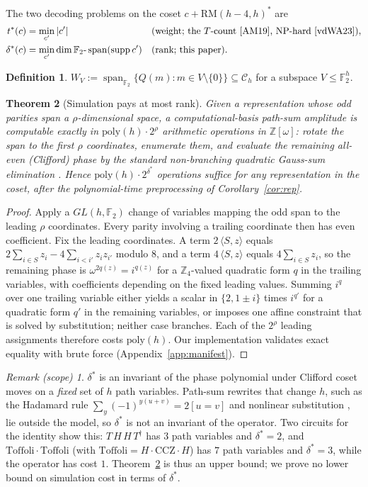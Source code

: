 \documentclass[11pt]{article}
\newtheorem{theorem}{Theorem}
\theoremstyle{definition}
\newtheorem{definition}[theorem]{Definition}
\theoremstyle{remark}
\newtheorem*{scope}{Remark (scope)}
\newcommand{\F}{\mathbb{F}_2}
\newcommand{\Z}{\mathbb{Z}}
\newcommand{\RM}{\mathrm{RM}}
\newcommand{\spn}{\operatorname{span}}
\newcommand{\supp}{\operatorname{supp}}
\newcommand{\ds}{\delta^{*}}
\newcommand{\ts}{t^{*}}
\newcommand{\Ch}{\mathcal{C}_h}
\newcommand{\ip}[2]{\langle #1,#2\rangle}
\begin{document}
The two decoding problems on the coset $c+\RM(h-4,h)^{*}$ are
\begin{align*}
  \ts(c)&=\min_{c'}|c'| &&\text{(weight; the $T$-count \cite{AM19}, NP-hard \cite{vdWA23})},\\
  \ds(c)&=\min_{c'}\dim\F\text{-}\spn(\supp c') &&\text{(rank; this paper)}.
\end{align*}

\begin{definition}\label{def:W}
$W_V:=\spn_{\F}\{Q(m):m\in V\setminus\{0\}\}\subseteq\Ch$ for a subspace $V\le\F^h$.
\end{definition}

\begin{theorem}[Simulation pays at most rank]\label{thm:sim}
Given a representation whose odd parities span a $\rho$-dimensional space, a computational-basis
path-sum amplitude is computable exactly in $\mathrm{poly}(h)\cdot2^{\rho}$ arithmetic operations in $\Z[\omega]$:
rotate the span to the first $\rho$ coordinates, enumerate them,
and evaluate the remaining all-even (Clifford) phase by the standard non-branching quadratic
Gauss-sum elimination \cite{Amy19}. Hence $\mathrm{poly}(h)\cdot2^{\ds}$ operations suffice for any
representation in the coset, after the polynomial-time preprocessing of Corollary~\ref{cor:rep}.
\end{theorem}

\begin{proof}
Apply a $GL(h,\F)$ change of variables mapping the odd span to the leading $\rho$ coordinates. Every
parity involving a trailing coordinate then has even coefficient. Fix the leading coordinates. A term
$2\,\ip Sz$ equals $2\sum_{i\in S}z_i-4\sum_{i<i'}z_iz_{i'}$ modulo $8$, and a term $4\,\ip Sz$ equals $4\sum_{i\in S}z_i$,
so the remaining phase is $\omega^{2q(z)}=i^{q(z)}$ for a $\Z_4$-valued quadratic form $q$ in the trailing variables,
with coefficients depending on the fixed leading values. Summing $i^{q}$ over one trailing variable either
yields a scalar in $\{2,1\pm i\}$ times $i^{q'}$ for a quadratic form $q'$ in the remaining variables, or imposes one
affine constraint that is solved by substitution; neither case branches. Each of the $2^{\rho}$ leading assignments therefore costs
$\mathrm{poly}(h)$. Our implementation validates exact equality with brute force (Appendix~\ref{app:manifest}).
\end{proof}

\begin{scope}
$\ds$ is an invariant of the phase polynomial under Clifford coset moves on a \emph{fixed} set of $h$ path
variables. Path-sum rewrites that change $h$, such as the Hadamard rule
$\sum_y(-1)^{y(u+v)}=2[u=v]$ and nonlinear substitution \cite{Amy19}, lie outside the model, so $\ds$
is not an invariant of the operator. Two circuits for the identity show this: $T\,H\,H\,T^{\dagger}$ has
$3$ path variables and $\ds=2$, and $\mathrm{Toffoli}\cdot\mathrm{Toffoli}$ (with $\mathrm{Toffoli}=H\cdot\mathrm{CCZ}\cdot H$) has $7$ path
variables and $\ds=3$, while the operator has cost $1$. Theorem~\ref{thm:sim} is thus an upper bound; we prove no lower bound on
simulation cost in terms of $\ds$.
\end{scope}
\end{document}
